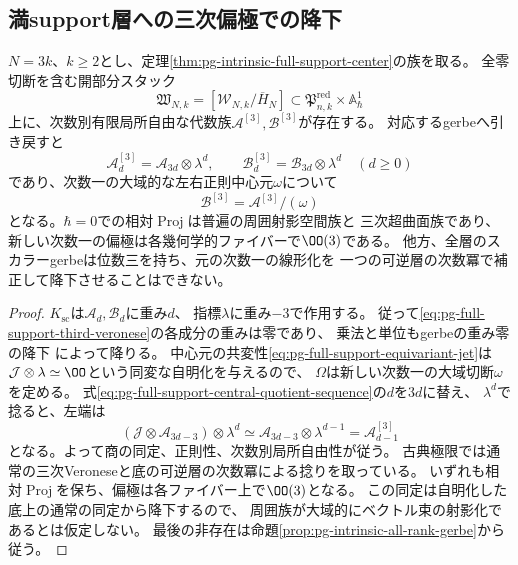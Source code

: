 \subsection{満support層への三次偏極での降下}
\begin{corollary}[満support層の三次Veronese族]
\label{cor:pg-full-support-veronese-descent}
$N=3k$、$k\ge2$とし、定理\ref{thm:pg-intrinsic-full-support-center}の族を取る。
全零切断を含む開部分スタック
\begin{equation}
 \mathfrak W_{N,k}=[\mathcal W_{N,k}/\overline H_N]
 \subset\mathfrak P_{n,k}^{\mathrm{red}}\times\mathbb A^1_\hbar
 \label{eq:pg-full-support-effective-open}
\end{equation}
上に、次数別有限局所自由な代数族$\mathcal A^{[3]},\mathcal B^{[3]}$が存在する。
対応するgerbeへ引き戻すと
\begin{equation}
 \mathcal A^{[3]}_d=\mathcal A_{3d}\otimes\lambda^d,
 \qquad
 \mathcal B^{[3]}_d=\mathcal B_{3d}\otimes\lambda^d
 \quad(d\ge0)
 \label{eq:pg-full-support-third-veronese}
\end{equation}
であり、次数一の大域的な左右正則中心元$\omega$について
\begin{equation}
 \mathcal B^{[3]}=\mathcal A^{[3]}/(\omega)
 \label{eq:pg-full-support-veronese-quotient}
\end{equation}
となる。$\hbar=0$での相対$\operatorname{Proj}$は普遍の周囲射影空間族と
三次超曲面族であり、新しい次数一の偏極は各幾何学的ファイバーで$\OO(3)$である。
他方、全層のスカラーgerbeは位数三を持ち、元の次数一の線形化を
一つの可逆層の次数冪で補正して降下させることはできない。
\end{corollary}
\begin{proof}
$K_{\mathrm{sc}}$は$\mathcal A_d,\mathcal B_d$に重み$d$、
指標$\lambda$に重み$-3$で作用する。
従って\eqref{eq:pg-full-support-third-veronese}の各成分の重みは零であり、
乗法と単位もgerbeの重み零の降下
\cite[Proposition~4.10]{PBerghSchnurerGerbes}によって降りる。
中心元の共変性\eqref{eq:pg-full-support-equivariant-jet}は
$\mathcal J\otimes\lambda\simeq\OO$という同変な自明化を与えるので、
$\Omega$は新しい次数一の大域切断$\omega$を定める。
式\eqref{eq:pg-full-support-central-quotient-sequence}の$d$を$3d$に替え、
$\lambda^d$で捻ると、左端は
\begin{equation}
 (\mathcal J\otimes\mathcal A_{3d-3})\otimes\lambda^d
   \simeq\mathcal A_{3d-3}\otimes\lambda^{d-1}
   =\mathcal A^{[3]}_{d-1}
 \label{eq:pg-full-support-veronese-exact-sequence}
\end{equation}
となる。よって商の同定、正則性、次数別局所自由性が従う。
古典極限では通常の三次Veroneseと底の可逆層の次数冪による捻りを取っている。
いずれも相対$\operatorname{Proj}$を保ち、偏極は各ファイバー上で$\OO(3)$となる。
この同定は自明化した底上の通常の同定から降下するので、
周囲族が大域的にベクトル束の射影化であるとは仮定しない。
最後の非存在は命題\ref{prop:pg-intrinsic-all-rank-gerbe}から従う。
\end{proof}

